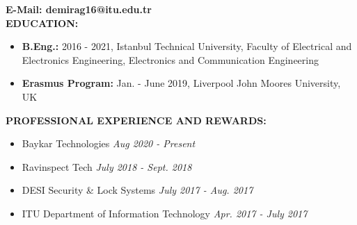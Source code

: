 \vspace{-3mm}
\textbf{E-Mail: {\normalfont demirag16@itu.edu.tr}} \\


\textbf{EDUCATION:}
\vspace{-3mm}
\begin{itemize}
  \item \textbf{B.Eng.:} 2016 - 2021, Istanbul Technical University, Faculty of Electrical and Electronics Engineering, Electronics and Communication Engineering
  \item \textbf{Erasmus Program:} Jan. - June 2019, Liverpool John Moores University, UK
\end{itemize}

\textbf{PROFESSIONAL EXPERIENCE AND REWARDS:}
\vspace{-3mm}
\begin{itemize}
  \item Baykar Technologies \hfill \textit{Aug 2020 - Present}
  \item Ravinspect Tech \hfill \textit{July 2018 - Sept. 2018}
  \item DESI Security \& Lock Systems \hfill \textit{July 2017 - Aug. 2017}
  \item ITU Department of Information Technology \hfill \textit{Apr. 2017 - July 2017}
\end{itemize}


\vspace{-3mm}

\newpage

\vspace{10mm}

\newsavebox{\mysquarebeng}
\savebox{\mysquarebeng}{\textcolor{black}{\rule[2.3pt]{3.4pt}{3.4pt}}}

\setlength{\TPHorizModule}{10pt}
\setlength{\TPVertModule}{10pt}

